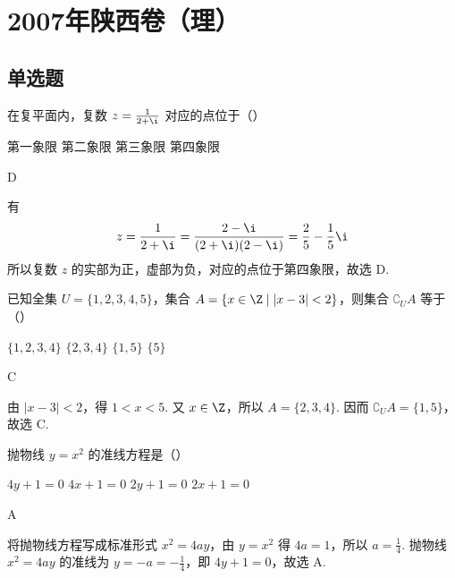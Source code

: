 \chapter{2007年陕西卷（理）}

\section{单选题}

\begin{problem}
在复平面内，复数 \(z = \frac{1}{2 + \i}\) 对应的点位于（\quad）

\choices
    {第一象限}
    {第二象限}
    {第三象限}
    {第四象限}
\end{problem}

\begin{answer}
D
\end{answer}

\begin{solution}
有
\[
z=\frac{1}{2+\i}=\frac{2-\i}{(2+\i)(2-\i)}=\frac{2}{5}-\frac{1}{5}\i
\]
所以复数 \(z\) 的实部为正，虚部为负，对应的点位于第四象限，故选 D.
\end{solution}

\begin{problem}
已知全集 \(U = \{1, 2, 3, 4, 5\}\)，集合 \(A = \{x \in \Z \mid |x - 3| < 2\}\)，则集合 \(\complement_U A\) 等于（\quad）

\choices
    {\( \{1, 2, 3, 4\} \)}
    {\( \{2, 3, 4\} \)}
    {\( \{1, 5\} \)}
    {\( \{5\} \)}
\end{problem}

\begin{answer}
C
\end{answer}

\begin{solution}
由 \(|x-3|<2\)，得 \(1<x<5\). 又 \(x\in\Z\)，所以
\(A=\{2,3,4\}\). 因而
\(\complement_U A=\{1,5\}\)，故选 C.
\end{solution}

\begin{problem}
抛物线 \( y = x^{2} \) 的准线方程是（\quad）

\choices
    {\(4y + 1 = 0\)}
    {\(4x + 1 = 0\)}
    {\(2y + 1 = 0\)}
    {\(2x + 1 = 0\)}
\end{problem}

\begin{answer}
A
\end{answer}

\begin{solution}
将抛物线方程写成标准形式 \(x^2=4ay\)，由 \(y=x^2\) 得 \(4a=1\)，所以 \(a=\frac14\). 抛物线 \(x^2=4ay\) 的准线为 \(y=-a=-\frac14\)，即 \(4y+1=0\)，故选 A.
\end{solution}

